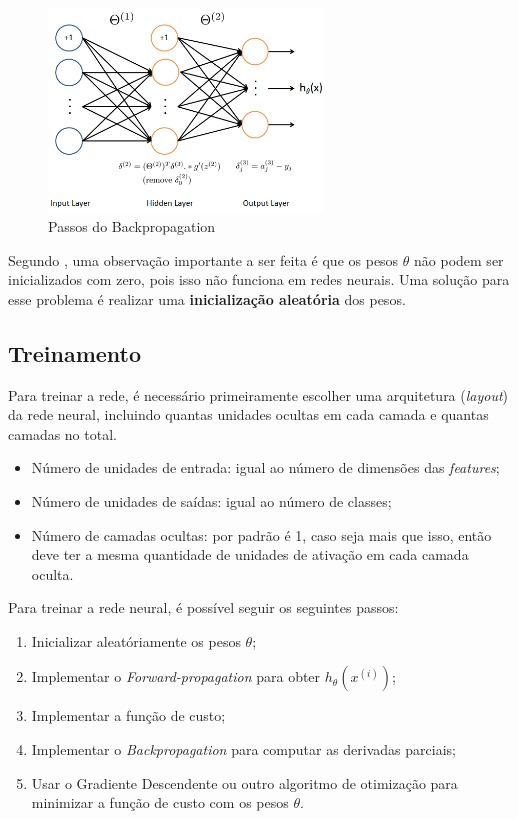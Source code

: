 \begin{figure}
\centering
\caption{Passos do Backpropagation} \label{fig:backpropagationalgex}
\includegraphics[width=0.65\textwidth]{img/backpropagationalg}
\end{figure}

Segundo \cite{machinelearningcoursera}, uma observação importante a ser feita é que os pesos $\theta$ não podem ser inicializados com zero, pois isso não funciona em redes neurais. Uma solução para esse problema é realizar uma \textbf{inicialização aleatória} dos pesos.

\subsection{Treinamento}

Para treinar a rede, é necessário primeiramente escolher uma arquitetura (\textit{layout}) da rede neural, incluindo quantas unidades ocultas em cada camada e quantas camadas no total.

\begin{itemize}
	\item Número de unidades de entrada: igual ao número de dimensões das \textit{features};
	\item Número de unidades de saídas: igual ao número de classes;
	\item Número de camadas ocultas: por padrão é 1, caso seja mais que isso, então deve ter a mesma quantidade de unidades de ativação em cada camada oculta.
\end{itemize}

Para treinar a rede neural, é possível seguir os seguintes passos:

\begin{enumerate}

\item Inicializar aleatóriamente os pesos $\theta$;
\item Implementar o \textit{Forward-propagation} para obter $h_\theta(x^{(i)})$;
\item Implementar a função de custo;
\item Implementar o \textit{Backpropagation} para computar as derivadas parciais;
\item Usar o Gradiente Descendente ou outro algoritmo de otimização para minimizar a função de custo com os pesos $\theta$.

\end{enumerate}


